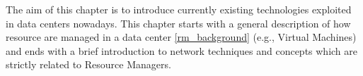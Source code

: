 The aim of this chapter is to introduce currently existing technologies exploited in data centers nowadays.
This chapter starts with a general description of how resource are managed in a data center \autoref{rm_background} (e.g., Virtual Machines) and ends with a brief introduction to network techniques and concepts which are strictly related to Resource Managers.